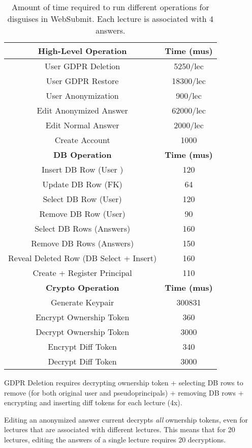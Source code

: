 \begin{table}
\begin{center}
\begin{tabular}{ c c }
 \textbf{High-Level Operation} & \textbf{Time (mus)}\\
\hline
    User GDPR Deletion & 5250/lec\\
    User GDPR Restore & 18300/lec\\
    User Anonymization & 900/lec\\
    Edit Anonymized Answer & 62000/lec \\
    Edit Normal Answer & 2000/lec \\
    Create Account & 1000\\
\hline
    \textbf{DB Operation} & \textbf{Time (mus)}\\
\hline
Insert DB Row (User )& 120\\
Update DB Row (FK) & 64\\ 
Select DB Row (User) & 120\\
Remove DB Row (User) & 90\\
Select DB Rows (Answers) & 160\\
Remove DB Rows (Answers) & 150\\
Reveal Deleted Row (DB Select + Insert) & 160 \\
Create + Register Principal & 110\\
\hline
    \textbf{Crypto Operation} & \textbf{Time (mus)}\\
\hline
Generate Keypair & 300831\\
Encrypt Ownership Token & 360\\
Decrypt Ownership Token & 3000\\
Encrypt Diff Token & 340\\
Decrypt Diff Token & 3000\\
\end{tabular}
\end{center}
\caption{Amount of time required to run different operations for disguises in WebSubmit. Each
    lecture is associated with 4 answers.}
\end{table}

GDPR Deletion requires decrypting ownership token + selecting DB rows to remove (for both original
user and pseudoprincipals) + removing DB rows +
encrypting and inserting diff tokens for each lecture (4x).

Editing an anonymized answer current decrypts \emph{all} ownership tokens, even for lectures that
are associated with different lectures. This means that for 20 lectures, editing the answers
of a single lecture requires 20 decryptions.
